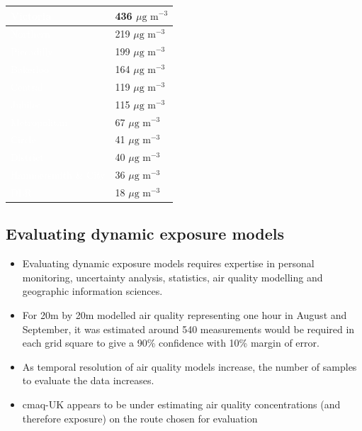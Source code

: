 \begin{table}[H]
\centering
    \begin{tabular}{ | l | l |} \hline
     \cellcolor{victoria} \textcolor{white}{Victoria}                      & 436 $\mu \text{g m}^{-3}$   \\ \hline
     \cellcolor{northern} \textcolor{white}{Northern}                      & 219 $\mu \text{g m}^{-3}$   \\ \hline
     \cellcolor{piccadilly} \textcolor{white}{Piccadilly}                  & 199 $\mu \text{g m}^{-3}$   \\ \hline
     \cellcolor{bakerloo} \textcolor{white}{Bakerloo}                      & 164 $\mu \text{g m}^{-3}$   \\ \hline
     \cellcolor{central} \textcolor{white}{Central}                        & 119 $\mu \text{g m}^{-3}$   \\ \hline
     \cellcolor{jubilee} \textcolor{white}{Jubilee}                        & 115 $\mu \text{g m}^{-3}$   \\ \hline
     \cellcolor{metropolitan} \textcolor{white}{Metropolitan }             & 67 $\mu \text{g m}^{-3}$    \\ \hline
     \cellcolor{circle} \textcolor{white}{Circle}                          & 41 $\mu \text{g m}^{-3}$    \\ \hline
     \cellcolor{district} \textcolor{white}{District}                      & 40 $\mu \text{g m}^{-3}$    \\ \hline
     \cellcolor{hammersmithcity} \textcolor{white}{Hammersmith \& City}    & 36 $\mu \text{g m}^{-3}$    \\ \hline
     \cellcolor{dlr} \textcolor{white}{DLR}                                & 18 $\mu \text{g m}^{-3}$    \\ \hline
    \end{tabular}
\label{tab:london_underground_air_quality}
\end{table}

\subsection{Evaluating dynamic exposure models}
\label{subsec:wrapup_conc_evaluation}

\begin{itemize}
    \item Evaluating dynamic exposure models requires expertise in personal monitoring, uncertainty analysis, statistics, air quality modelling and geographic information sciences.
    \item For 20m by 20m modelled air quality representing one hour in August and September, it was estimated around 540 measurements would be required in each grid square to give a 90\% confidence with 10\% margin of error.
    \item As temporal resolution of air quality models increase, the number of samples to evaluate the data increases.
    \item \gls{cmaq}-UK appears to be under estimating air quality concentrations (and therefore exposure) on the route chosen for evaluation
\end{itemize}

